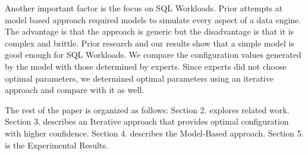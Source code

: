 Another important factor is the focus on SQL Workloads. Prior attempts at model based approach required models to simulate every aspect of a 
data engine. The advantage is that the approach is generic but the disadvantage is that it is complex and brittle. Prior research and our results
show that a simple model is good enough for SQL Workloads. We compare the configuration values generated by the model with those determined by experts.
Since experts did not choose optimal parameters, we determined optimal parameters using an iterative approach and compare with it as well.

The rest of the paper is organized as follows: Section 2. explores related work. Section 3. describes an Iterative approach that provides optimal 
configuration with higher confidence. Section 4. describes the Model-Based approach. Section 5. is the Experimental Results.

